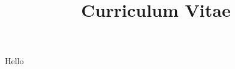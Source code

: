 \documentclass[11pt,letterpaper,sans]{moderncv} %
\title{Curriculum Vitae}
\begin{document}
    Hello
\end{document}
